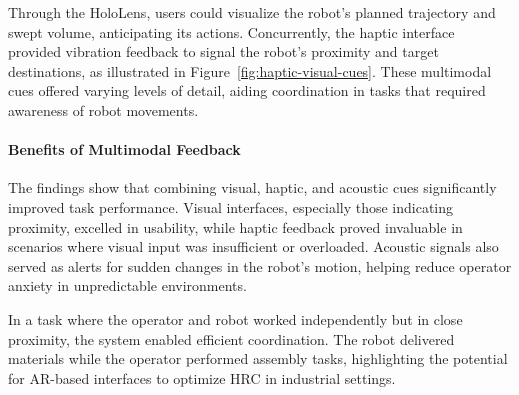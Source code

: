 Through the HoloLens, users could visualize the robot's planned trajectory and swept volume, anticipating its actions. Concurrently, the haptic interface provided vibration feedback to signal the robot's proximity and target destinations, as illustrated in Figure~\ref{fig:haptic-visual-cues}. These multimodal cues offered varying levels of detail, aiding coordination in tasks that required awareness of robot movements.

\paragraph{Benefits of Multimodal Feedback}

The findings show that combining visual, haptic, and acoustic cues significantly improved task performance. Visual interfaces, especially those indicating proximity, excelled in usability, while haptic feedback proved invaluable in scenarios where visual input was insufficient or overloaded. Acoustic signals also served as alerts for sudden changes in the robot's motion, helping reduce operator anxiety in unpredictable environments.

In a task where the operator and robot worked independently but in close proximity, the system enabled efficient coordination. The robot delivered materials while the operator performed assembly tasks, highlighting the potential for \ac{AR}-based interfaces to optimize \ac{HRC} in industrial settings.

